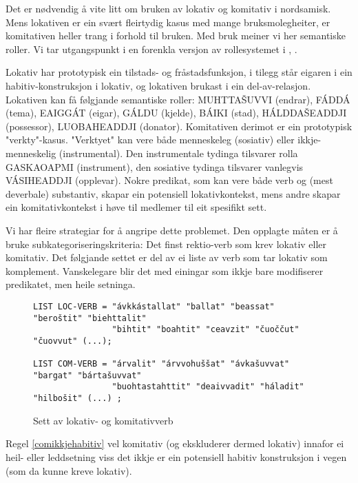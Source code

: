 \documentclass[a4paper,norsk]{article}
\begin{document}
Det er nødvendig å vite litt om bruken av lokativ og komitativ i nordsamisk. Mens lokativen er ein svært fleirtydig kasus med mange bruksmolegheiter, er komitativen heller trang i forhold til bruken. Med bruk meiner vi her semantiske roller. Vi tar utgangspunkt i en forenkla versjon av rollesystemet i \citet{Sammallahti02},\citet{Sammallahti05} %
.

Lokativ har prototypisk ein tilstads- og fråstadsfunksjon, i tilegg står eigaren i ein habitiv-konstruksjon i lokativ, og lokativen brukast i ein del-av-relasjon. Lokativen kan få følgjande semantiske roller: MUHTTAŠUVVI (endrar), FÁDDÁ (tema), EAIGGÁT (eigar), GÁLDU (kjelde), BÁIKI (stad), HÁLDDAŠEADDJI (possessor), LUOBAHEADDJI (donator). Komitativen derimot er ein prototypisk "verkty"-kasus. "Verktyet" kan vere både menneskeleg (sosiativ) eller ikkje-menneskelig (instrumental). Den instrumentale tydinga tilsvarer rolla GASKAOAPMI (instrument), den sosiative tydinga tilsvarer vanlegvis VÁSIHEADDJI (opplevar).
Nokre predikat, som kan vere både verb og (mest deverbale) substantiv, skapar ein potensiell lokativkontekst, mens andre skapar ein komitativkontekst i høve til medlemer til eit spesifikt sett.

Vi har fleire strategiar for å angripe dette problemet. Den opplagte måten er å bruke subkategoriseringskriteria: Det finst rektio-verb som krev lokativ eller komitativ. Det følgjande settet er del av ei liste av verb som tar lokativ som komplement. Vanskelegare blir det med einingar som ikkje bare modifiserer predikatet, men heile setninga. %

\begin{figure}[htbp]
\begin{center}
\begin{verbatim}
LIST LOC-VERB = "ávkkástallat" "ballat" "beassat" "beroštit" "biehttalit"
			 	"bihtit" "boahtit" "ceavzit" "čuoččut" "čuovvut" (...);
			 	
LIST COM-VERB = "árvalit" "árvvohuššat" "ávkašuvvat" "bargat" "bártašuvvat"
 				"buohtastahttit" "deaivvadit" "háladit" "hilbošit" (...) ;
\end{verbatim}
\caption{Sett av lokativ- og komitativverb}
\label{loccomverb}
\end{center}
\end{figure}

Regel \ref{comikkjehabitiv} vel komitativ (og ekskluderer dermed lokativ) innafor ei heil- eller leddsetning viss det ikkje er ein potensiell habitiv konstruksjon i vegen (som da kunne kreve lokativ). %
\end{document}
